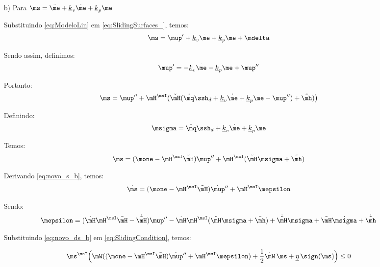 \documentclass[]{politex}
\begin{document}
\begin{itemize}
\item[b)] Para $\ms = \ddot{\me} + \underline{k}_v \dot{\me} + \underline{k}_p \me  $

Substituindo \eqref{eq:ModeloLin} em \eqref{eq:SlidingSurfaces_}, temos:
\begin{equation}
\ms = \mup' + \underline{k}_v \dot{\me} + \underline{k}_p \me + \mdelta
\end{equation}

Sendo assim, definimos:
\begin{equation}
\mup' = -\underline{k}_v \dot{\me} - \underline{k}_p \me + \mup''
\end{equation}

Portanto:
\begin{equation}
\ms = \mup'' + \mH^\msI( \tilde{\mH}(\ddot{\mq}\ssh_d + \underline{k}_v \dot{\me} + \underline{k}_p \me - \mup'') + \tilde{\mh} ) \big)
\end{equation}

Definindo:
\begin{equation}
\msigma = \ddot{\mq}\ssh_d + \underline{k}_v \dot{\me} + \underline{k}_p \me
\end{equation}

Temos:
\begin{equation} \label{eq:novo_s_b}
\ms = (\mone - \mH^\msI \tilde{\mH} )\mup'' + \mH^\msI( \tilde{\mH}\msigma + \tilde{\mh} )
\end{equation}

Derivando \eqref{eq:novo_s_b}, temos:
\begin{equation} \label{eq:novo_ds_b}
\dot{\ms} = (\mone - \mH^\msI \tilde{\mH} )\dot{\mup}'' + \mH^\msI \mepsilon
\end{equation}

Sendo:
\begin{equation}
\mepsilon = ( \dot{\mH} \mH^\msI \tilde{\mH} -\dot{\tilde{\mH}}) \mup'' -  \dot{\mH} \mH^\msI ( \tilde{\mH}\msigma + \tilde{\mh} ) +  \dot{\tilde{\mH}}\msigma + \tilde{\mH} \dot{\msigma} + \dot{\tilde{\mh}}
\end{equation}


Substituindo \eqref{eq:novo_ds_b} em \eqref{eq:SlidingCondition}, temos:

\begin{equation} \label{eq:SlidingCondition2b}
\ms^\msT \Big(\mW ( (\mone - \mH^\msI \tilde{\mH} )\dot{\mup}'' + \mH^\msI \mepsilon ) + \frac{1}{2}\dot{\mW} \, \ms + \underline{\eta} \, \sign(\ms) \Big) \leq 0
\end{equation} \\



\end{itemize}
\end{document}
